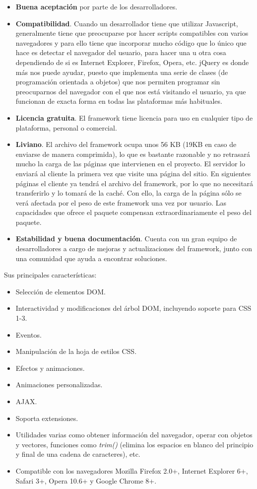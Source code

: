     \begin{itemize}
      \item {\bf Buena aceptación} por parte de los desarrolladores.
      \item {\bf Compatibilidad}. Cuando un desarrollador tiene que utilizar Javascript, generalmente tiene que preocuparse por hacer scripts compatibles con varios navegadores y para ello tiene que incorporar mucho código que lo único que hace es detectar el navegador del usuario, para hacer una u otra cosa dependiendo de si es Internet Explorer, Firefox, Opera, etc. jQuery es donde más nos puede ayudar, puesto que implementa una serie de clases (de programación orientada a objetos) que nos permiten programar sin preocuparnos del navegador con el que nos está visitando el usuario, ya que funcionan de exacta forma en todas las plataformas más habituales.
      \item {\bf Licencia gratuita}. El framework tiene licencia para uso en cualquier tipo de plataforma, personal o comercial.
      \item {\bf Liviano}. El archivo del framework ocupa unos 56 KB (19KB en caso de enviarse de manera comprimida), lo que es bastante razonable y no retrasará mucho la carga de las páginas que intervienen en el proyecto. El servidor lo enviará al cliente la primera vez que visite una página del sitio. En siguientes páginas el cliente ya tendrá el archivo del framework, por lo que no necesitará transferirlo y lo tomará de la caché. Con ello, la carga de la página sólo se verá afectada por el peso de este framework una vez por usuario. Las capacidades que ofrece el paquete compensan extraordinariamente el peso del paquete.
      \item {\bf Estabilidad y buena documentación}. Cuenta con un gran equipo de desarrolladores a cargo de mejoras y actualizaciones del framework, junto con una comunidad que ayuda a encontrar soluciones.
    \end{itemize}
    
  Sus principales características:
  
  \begin{itemize}
    \item Selección de elementos DOM.
    \item Interactividad y modificaciones del árbol DOM, incluyendo soporte para CSS 1-3.
    \item Eventos.
    \item Manipulación de la hoja de estilos CSS.
    \item Efectos y animaciones.
    \item Animaciones personalizadas.
    \item AJAX.
    \item Soporta extensiones.
    \item Utilidades varias como obtener información del navegador, operar con objetos y vectores, funciones como {\it trim()} (elimina los espacios en blanco del principio y final de una cadena de caracteres), etc.
    \item Compatible con los navegadores Mozilla Firefox 2.0+, Internet Explorer 6+, Safari 3+, Opera 10.6+ y Google Chrome 8+.
  \end{itemize}  
  
